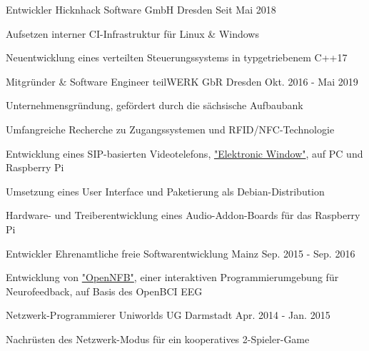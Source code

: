 
\begin{cventries}

  \cventry
    {Entwickler} %
    {Hicknhack Software GmbH} %
    {Dresden} %
    {Seit Mai 2018} %
    {
      \begin{cvitems} %
        \item {Aufsetzen interner CI-Infrastruktur für Linux \& Windows }
        \item {Neuentwicklung eines verteilten Steuerungssystems in typgetriebenem C++17 }
      \end{cvitems}
    }

  \cventry
    {Mitgründer \& Software Engineer} %
    {teilWERK GbR} %
    {Dresden} %
    {Okt. 2016 - Mai 2019} %
    {
      \begin{cvitems} %
        \item {Unternehmensgründung, gefördert durch die sächsische Aufbaubank}
        \item {Umfangreiche Recherche zu Zugangssystemen und RFID/NFC-Technologie}
        \item {Entwicklung eines SIP-basierten Videotelefons, \href{https://ewindow.org}{"Elektronic Window"}, auf PC und Raspberry Pi}
        \item {Umsetzung eines User Interface und Paketierung als Debian-Distribution }
        \item {Hardware- und Treiberentwicklung eines Audio-Addon-Boards für das Raspberry Pi}
      \end{cvitems}
    }

  \cventry
    {Entwickler} %
    {Ehrenamtliche freie Softwarentwicklung} %
    {Mainz} %
    {Sep. 2015 - Sep. 2016} %
    {
      \begin{cvitems} %
        \item {Entwicklung von \href{https://github.com/strfry/OpenNFB}{"OpenNFB"}, einer interaktiven Programmierumgebung für Neurofeedback, auf Basis des OpenBCI EEG}
      \end{cvitems}
    }

  \cventry
    {Netzwerk-Programmierer} %
    {Uniworlds UG} %
    {Darmstadt} %
    {Apr. 2014 - Jan. 2015} %
    {
      \begin{cvitems} %
        \item {Nachrüsten des Netzwerk-Modus für ein kooperatives 2-Spieler-Game}
      \end{cvitems}
    }


\end{cventries}
